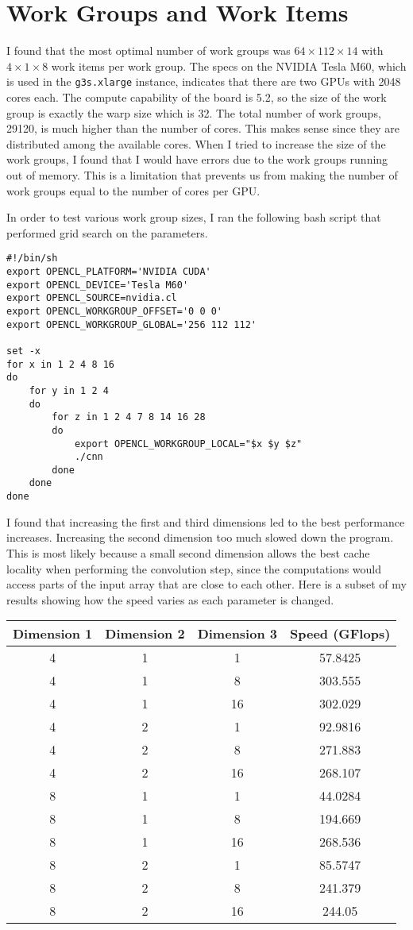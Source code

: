 \documentclass[12pt]{article}
\begin{document}
\section{Work Groups and Work Items}

I found that the most optimal number of work groups was \(64\times112\times 14\) with \(4\times 1\times 8\) work items per work group.
The specs on the NVIDIA Tesla M60, which is used in the \texttt{g3s.xlarge} instance, indicates that there are two GPUs with 2048 cores each.
The compute capability of the board is 5.2, so the size of the work group is exactly the warp size which is 32. The total number of work groups,
29120, is much higher than the number of cores. This makes sense since they are distributed among the available cores. When I tried to increase
the size of the work groups, I found that I would have errors due to the work groups running out of memory. This is a limitation that prevents
us from making the number of work groups equal to the number of cores per GPU.

In order to test various work group sizes, I ran the following bash script that performed grid search on the parameters.
\begin{verbatim}
#!/bin/sh
export OPENCL_PLATFORM='NVIDIA CUDA'
export OPENCL_DEVICE='Tesla M60'
export OPENCL_SOURCE=nvidia.cl
export OPENCL_WORKGROUP_OFFSET='0 0 0'
export OPENCL_WORKGROUP_GLOBAL='256 112 112'

set -x
for x in 1 2 4 8 16
do
    for y in 1 2 4
    do
        for z in 1 2 4 7 8 14 16 28
        do
            export OPENCL_WORKGROUP_LOCAL="$x $y $z"
            ./cnn
        done
    done
done
\end{verbatim}
I found that increasing the first and third dimensions led to the best performance increases. Increasing
the second dimension too much slowed down the program. This is most likely because a small second dimension allows the best cache
locality when performing the convolution step, since the computations would access parts of the input array that are close to each
other. Here is a subset of my results showing how the speed varies as each parameter is changed.
\begin{center}
    \begin{tabular}{ccc|c}
        Dimension 1 & Dimension 2 & Dimension 3 & Speed (GFlops)\\
        \hline
        4 & 1 & 1 & 57.8425\\
        4 & 1 & 8 & 303.555\\
        4 & 1 & 16 & 302.029\\
        4 & 2 & 1 & 92.9816\\
        4 & 2 & 8 & 271.883\\
        4 & 2 & 16 & 268.107\\
        8 & 1 & 1 & 44.0284\\
        8 & 1 & 8 & 194.669\\
        8 & 1 & 16 & 268.536\\
        8 & 2 & 1 & 85.5747\\
        8 & 2 & 8 & 241.379\\
        8 & 2 & 16 & 244.05
    \end{tabular}
\end{center}
\end{document}
